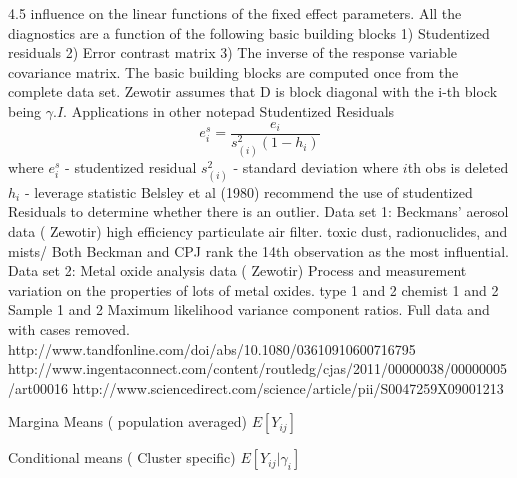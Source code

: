 \documentclass[12pt, a4paper]{article}
\begin{document}
4.5 influence on the linear functions of the fixed effect parameters.
All the diagnostics are a function of the following basic building blocks
1)  	Studentized residuals
2)  	Error contrast matrix
3)  	The inverse of the response variable covariance matrix.
The basic building blocks are computed once from the complete data set.
Zewotir assumes that D is block diagonal with the i-th block being $\gamma. I$.
Applications in other notepad
Studentized Residuals
\[ e^s_i = \frac{e_i}{s^2_{(i)}(1-h_i)} \]
where
$e^s_i $ - studentized residual
$s^2_{(i)}$ - standard deviation where $i$th obs is deleted
$h_i$ - leverage statistic
Belsley et al (1980) recommend the use of studentized Residuals to determine whether there is an outlier.
Data set 1: Beckmans' aerosol data ( Zewotir)
high efficiency particulate air filter.
toxic dust, radionuclides, and mists/
Both Beckman and CPJ rank the 14th observation as the most influential.
Data set 2: Metal oxide analysis data ( Zewotir)
Process and measurement variation on the properties of lots of metal oxides.
type 1 and 2
chemist 1 and 2
Sample 1 and 2
Maximum likelihood variance component ratios.
Full data and with cases removed.
http://www.tandfonline.com/doi/abs/10.1080/03610910600716795
http://www.ingentaconnect.com/content/routledg/cjas/2011/00000038/00000005/art00016
http://www.sciencedirect.com/science/article/pii/S0047259X09001213



Margina Means ( population averaged)
$E[Y_{ij}]$

Conditional means ( Cluster specific)
$E[Y_{ij}|\gamma_{i}]$






\end{document}
